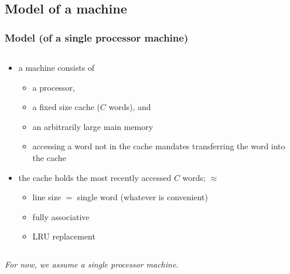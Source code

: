 \documentclass[12pt,dvipdfmx]{beamer}
\newcommand{\aka}[1]{{\color{red}#1}}
\begin{document}
\subsection{Model of a machine}

\begin{frame}
\frametitle{Model (of a single processor machine)}

\begin{columns}
\begin{column}{0.6\textwidth}
\begin{itemize}
\item<1-> a machine consists of 
  \begin{itemize}
  \item a processor,
  \item a fixed size cache ($C$ words), and
  \item an arbitrarily large main memory
  \item accessing a word not in the cache mandates 
    transferring the word into the cache
  \end{itemize}

\item<2-> the cache holds the most recently accessed
  $C$ words; $\approx$
  \begin{itemize}
  \item line size $=$ single word (whatever is convenient)
  \item fully associative
  \item LRU replacement
  \end{itemize}
\end{itemize}

\end{column}

\begin{column}{0.4\textwidth}
\begin{center}
\def\svgwidth{\textwidth}
{\scriptsize }
\end{center}
\end{column}  
\end{columns}

\begin{center}
\aka{\em For now, we assume a single processor machine.}
\end{center}
\end{frame}
\end{document}
